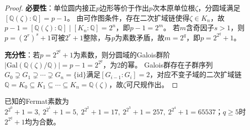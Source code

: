 \documentclass[../../main.tex]{subfiles}%
\begin{document}
\begin{proof}
\textbf{必要性}：单位圆内接正$p$边形等价于作出$p$次本原单位根$\zeta$，分圆域满足$[\mathbb{Q}(\zeta):\mathbb{Q}]=p-1$。
由可作图条件，存在二次扩域链使得$\zeta\in K_n$，故$p-1=[\mathbb{Q}(\zeta):\mathbb{Q}]\mid[K_n:\mathbb{Q}]=2^n$，即$p-1=2^m$。
若$m$含奇因子$s>1$，则$p=(2^r)^s+1$可被$2^r+1$整除，与$p$为素数矛盾，故$m=2^q$，即$p=2^{2^q}+1$。

\textbf{充分性}：若$p=2^{2^q}+1$为素数，则分圆域的Galois群阶$|\mathrm{Gal}(\mathbb{Q}(\zeta)/\mathbb{Q})|=p-1=2^{2^q}$，为2的幂。
Galois群存在子群序列$G_0\supsetneq G_1\supsetneq\cdots\supsetneq G_n=\{\mathrm{id}\}$满足$[G_{i-1}:G_i]=2$，对应不变子域的二次扩域链$\mathbb{Q}=K_0\subseteq K_1\subseteq\cdots\subseteq K_n=\mathbb{Q}(\zeta)$，故$\zeta$可尺规作出。
\end{proof}

\begin{remark}
已知的Fermat素数为$2^{2^0}+1=3,\ 2^{2^1}+1=5,\ 2^{2^2}+1=17,\ 2^{2^3}+1=257,\ 2^{2^4}+1=65537$；$q\geqslant5$时$2^{2^q}+1$均为合数。
\end{remark}
\end{document}

